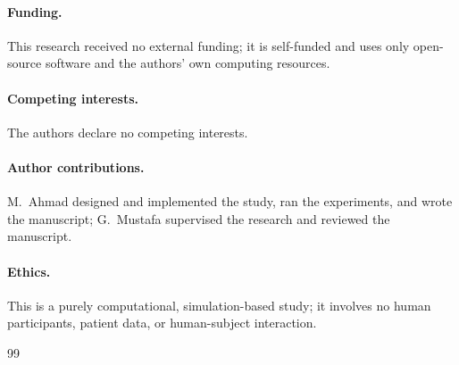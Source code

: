 \documentclass[11pt]{article}
\begin{document}
\paragraph{Funding.} This research received no external funding; it is
self-funded and uses only open-source software and the authors' own computing
resources.
\paragraph{Competing interests.} The authors declare no competing interests.
\paragraph{Author contributions.} M.~Ahmad designed and implemented the study,
ran the experiments, and wrote the manuscript; G.~Mustafa supervised the
research and reviewed the manuscript.
\paragraph{Ethics.} This is a purely computational, simulation-based study; it
involves no human participants, patient data, or human-subject interaction.

\begin{thebibliography}{99}

\end{thebibliography}
\end{document}
